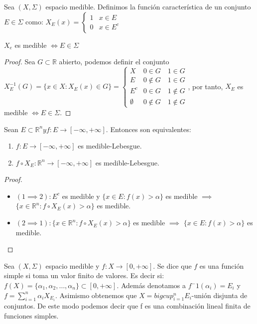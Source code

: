 \begin{definición}
    Sea $(X, \Sigma)$ espacio medible. Definimos la función característica de un conjunto $E \in \Sigma$ como: $X_E(x) = \begin{cases} 1 & x \in E \\ 0 & x \in E^c \end{cases}$
\end{definición}
\begin{observación}
    $X_e$ es medible $\iff E \in \Sigma$
\end{observación}
\begin{proof}
    Sea $G \subset \mathbb{R}$ abierto, podemos definir el conjunto $X_E^{-1}(G) = \{x \in X : X_E(x) \in G\} = \begin{cases} X & 0 \in G \quad 1\in G \\ E & 0 \not\in G \quad 1 \in G \\ E^c & 0 \in G \quad 1 \not\in G \\ \emptyset & 0 \not\in G \quad 1 \not\in G\end{cases}$, por tanto, $X_E$ es medible $\iff E \in \Sigma$.
\end{proof}
\begin{observación}
    Sean $E \subset \mathbb{R}^{n} y f: E \to [-\infty, +\infty]$. Entonces son equivalentes: 
    \begin{enumerate}
        \item $f: E \to [-\infty, +\infty]$ es medible-Lebesgue.
        \item $f \circ X_E: \mathbb{R}^n \to [-\infty, +\infty]$ es medible-Lebesgue.
    \end{enumerate}
\end{observación}
\begin{proof}
    \begin{itemize}
        \item $(1 \implies 2): E^c$ es medible y $\{x \in E : f(x) > \alpha\}$ es medible $\implies$ $\{x \in \mathbb{R}^n : f \circ X_E(x) > \alpha\}$ es medible.
        \item $(2 \implies 1): \{x \in \mathbb{R}^n : f \circ X_E(x) > \alpha\}$ es medible $\implies$ $\{x \in E : f(x) > \alpha\}$ es medible. 
    \end{itemize}
\end{proof}
\begin{definición}
    Sea $(X, \Sigma)$ espacio medible y $f: X \to [0, +\infty]$. Se dice que $f$ es una función simple si toma un valor finito de valores. Es decir si: 
    $f(X) = \{\alpha_1, \alpha_2, \dots, \alpha_n\} \subset [0, +\infty]$. 
    Además denotamos a $f^-1(\alpha_i) = E_i$ y $f = \sum_{i = 1}^{n}\alpha_iX_{E_i}$. Asimismo obtenemos que $X = bigcup_{i = 1}^{n}E_i$-unión disjunta de conjuntos. 
    De este modo podemos decir que f es una combinación lineal finita de funciones simples. 
\end{definición}
